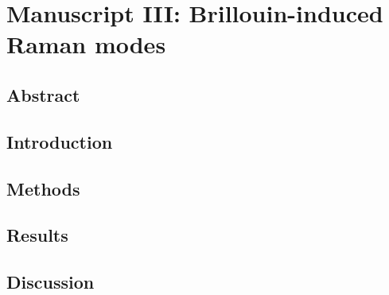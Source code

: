 \setcounter{rownumber}{0}
\singlespacing
\chapter{Manuscript III: Brillouin-induced Raman modes}
\label{ch:Raman}
\acresetall


%

%

\doublespacing


\section{Abstract}
\lipsum[2]


\section{Introduction}
\lipsum[2]

\section{Methods}
\lipsum[2]

\section{Results}
\lipsum[2]

\section{Discussion}
\lipsum[2]

